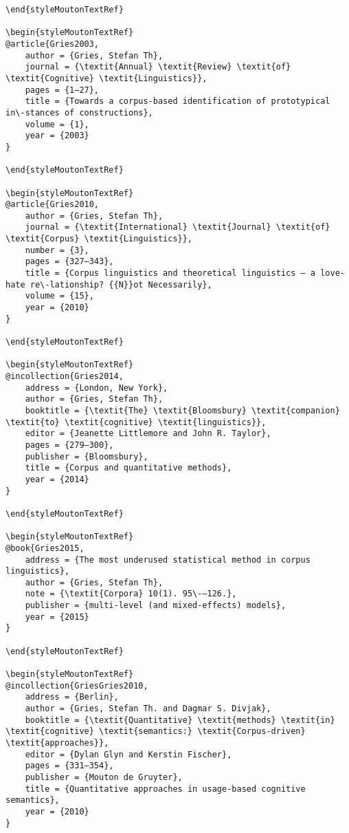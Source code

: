 \begin{styleMoutonHeadingi}
\begin{verbatim}
\end{styleMoutonTextRef}

\begin{styleMoutonTextRef}
@article{Gries2003,
	author = {Gries, Stefan Th},
	journal = {\textit{Annual} \textit{Review} \textit{of} \textit{Cognitive} \textit{Linguistics}},
	pages = {1–27},
	title = {Towards a corpus-based identification of prototypical in\-stances of constructions},
	volume = {1},
	year = {2003}
}

\end{styleMoutonTextRef}

\begin{styleMoutonTextRef}
@article{Gries2010,
	author = {Gries, Stefan Th},
	journal = {\textit{International} \textit{Journal} \textit{of} \textit{Corpus} \textit{Linguistics}},
	number = {3},
	pages = {327–343},
	title = {Corpus linguistics and theoretical linguistics – a love-hate re\-lationship? {{N}}ot Necessarily},
	volume = {15},
	year = {2010}
}

\end{styleMoutonTextRef}

\begin{styleMoutonTextRef}
@incollection{Gries2014,
	address = {London, New York},
	author = {Gries, Stefan Th},
	booktitle = {\textit{The} \textit{Bloomsbury} \textit{companion} \textit{to} \textit{cognitive} \textit{linguistics}},
	editor = {Jeanette Littlemore and John R. Taylor},
	pages = {279–300},
	publisher = {Bloomsbury},
	title = {Corpus and quantitative methods},
	year = {2014}
}

\end{styleMoutonTextRef}

\begin{styleMoutonTextRef}
@book{Gries2015,
	address = {The most underused statistical method in corpus linguistics},
	author = {Gries, Stefan Th},
	note = {\textit{Corpora} 10(1). 95\-–126.},
	publisher = {multi-level (and mixed-effects) models},
	year = {2015}
}

\end{styleMoutonTextRef}

\begin{styleMoutonTextRef}
@incollection{GriesGries2010,
	address = {Berlin},
	author = {Gries, Stefan Th. and Dagmar S. Divjak},
	booktitle = {\textit{Quantitative} \textit{methods} \textit{in} \textit{cognitive} \textit{semantics:} \textit{Corpus-driven} \textit{approaches}},
	editor = {Dylan Glyn and Kerstin Fischer},
	pages = {331–354},
	publisher = {Mouton de Gruyter},
	title = {Quantitative approaches in usage-based cognitive semantics},
	year = {2010}
}


\end{verbatim}
\end{styleMoutonHeadingi}

